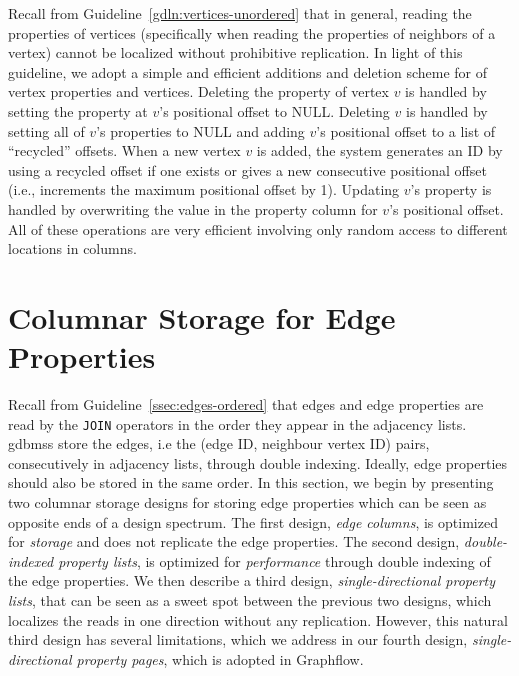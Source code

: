 
Recall from Guideline~\ref{gdln:vertices-unordered} that in general, reading the properties of vertices (specifically when reading the properties of neighbors of a vertex) cannot be localized without prohibitive replication. In light of this guideline, we adopt a simple and efficient additions and deletion scheme for of vertex properties and vertices. Deleting  the property of vertex $v$ is handled by setting the property at $v$'s positional offset to NULL.  Deleting $v$ is handled by setting all of $v$'s properties to NULL and adding $v$'s positional offset to a list of ``recycled'' offsets. When a new vertex $v$ is added, the system generates an ID by using a recycled offset if one exists or gives a new consecutive positional offset (i.e., increments the maximum positional offset by 1). Updating $v$'s property is handled by overwriting the value in the property column for $v$'s positional offset. All of these operations are very efficient involving only random access to different locations in columns.

\section{Columnar Storage for Edge Properties}
\label{sec:edge-property-columns}

Recall from Guideline~\ref{ssec:edges-ordered} that edges and edge properties  are read by the \texttt{JOIN} operators in the order they appear in the adjacency lists. \gls{gdbms}s store the edges, i.e the (edge ID, neighbour vertex ID) pairs, consecutively in adjacency lists, through double indexing. Ideally, edge properties should also be stored in the same order. In this section, we begin by presenting two columnar storage designs for storing edge properties which can be seen as opposite ends of a design spectrum. The first design, {\em edge columns}, is optimized for \emph{storage} and does not replicate the edge properties. The second design, {\em double-indexed property lists}, is optimized for \emph{performance} through double indexing of the edge properties. We then describe a third design, {\em single-directional property lists}, that can be seen as a sweet spot between the previous two designs, which localizes the reads in one direction without any replication. However, this natural third design has several limitations, which we address in our fourth design, {\em single-directional property pages}, which is adopted in Graphflow. 

